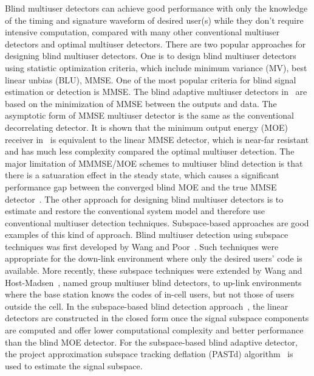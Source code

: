\documentclass[a4paper,11pt,fleqn]{article}
\begin{document}
Blind multiuser detectors can achieve good performance with only
the knowledge of the timing and signature waveform of desired
user(s) while they don't require intensive computation, compared
with many other conventional multiuser detectors and optimal
multiuser detectors. There are two popular approaches for
designing blind multiuser detectors. One is to design blind
multiuser detectors using statistic optimization criteria, which
include minimum variance (MV), best linear unbias (BLU), MMSE. One
of the most popular criteria for blind signal estimation or
detection is MMSE. The blind adaptive multiuser detectors
in~\cite{Madh94,Honi95} are based on the minimization of MMSE
between the outputs and data. The asymptotic form of MMSE
multiuser detector is the same as the conventional decorrelating
detector. It is shown that the minimum output energy (MOE)
receiver in~\cite{Honi95} is equivalent to the linear MMSE
detector, which is near-far resistant and has much less complexity
compared the optimal multiuser detection. The major limitation of
MMMSE/MOE schemes to multiuser blind detection is that there is a
satuaration effect in the steady state, which causes a significant
performance gap between the converged blind MOE and the true MMSE
detector~\cite{Honi95}. The other approach for designing blind
multiuser detectors is to estimate and restore the conventional
system model and therefore use conventional multiuser detection
techniques. Subspace-based approaches are good examples of this
kind of approach. Blind multiuser detection using subspace
techniques was first developed by Wang and Poor~\cite{Wang98,
Poor98}. Such techniques were appropriate for the down-link
environment where only the desired users' code is available. More
recently, these subspace techniques were extended by Wang and
Host-Madsen~\cite{Wang99}, named group multiuser blind detectors,
to up-link environments where the base station knows the codes of
in-cell users, but not those of users outside the cell. In the
subspace-based blind detection approach~\cite{Wang98}, the linear
detectors are constructed in the closed form once the signal
subspace components are computed and offer lower computational
complexity and better performance than the blind MOE detector. For
the subspace-based blind adaptive detector, the project
approximation subspace tracking deflation (PASTd)
algorithm~\cite{Yang95} is used to estimate the signal subspace.
\end{document}
